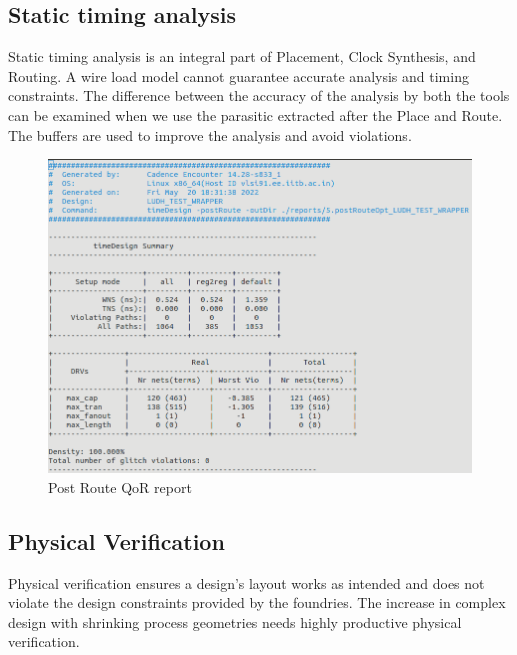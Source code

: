 \subsection{Static timing analysis}
Static timing analysis is an integral part of Placement, Clock Synthesis, and Routing. A wire load model cannot guarantee accurate analysis and timing constraints. The difference between the accuracy of the analysis by both the tools can be examined when we use the parasitic extracted after the Place and Route. The buffers are used to improve the analysis and avoid violations.

\begin{figure}[h]
  \centering
  \includegraphics[width = 0.8\linewidth]{./ASIC/STA.png}
  \caption{Post Route QoR report}
\end{figure}

\subsection{Physical Verification}
Physical verification ensures a design's layout works as intended and does not violate the design constraints provided by the foundries. The increase in complex design with shrinking process geometries needs highly productive physical verification. 

